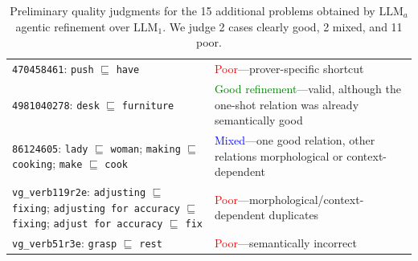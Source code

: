\begin{table}[t]
\begin{tabularx}{\textwidth}{@{}p{}p{}@{}}
\texttt{470458461}: \texttt{push} $\sqsubseteq$ \texttt{have} & \textcolor{red}{Poor}---prover-specific shortcut \\
\texttt{4981040278}: \texttt{desk} $\sqsubseteq$ \texttt{furniture} & \textcolor{green}{Good refinement}---valid, although the one-shot relation was already semantically good \\
\texttt{86124605}: \texttt{lady} $\sqsubseteq$ \texttt{woman}; \texttt{making} $\sqsubseteq$ \texttt{cooking}; \texttt{make} $\sqsubseteq$ \texttt{cook} & \textcolor{blue}{Mixed}---one good relation, other relations morphological or context-dependent \\
\texttt{vg\_verb119r2e}: \texttt{adjusting} $\sqsubseteq$ \texttt{fixing}; \texttt{adjusting for accuracy} $\sqsubseteq$ \texttt{fixing}; \texttt{adjust for accuracy} $\sqsubseteq$ \texttt{fix} & \textcolor{red}{Poor}---morphological/context-dependent duplicates \\
\texttt{vg\_verb51r3e}: \texttt{grasp} $\sqsubseteq$ \texttt{rest} & \textcolor{red}{Poor}---semantically incorrect \\
\bottomrule
\end{tabularx}
\caption{Preliminary quality judgments for the 15 additional problems obtained by $\mathrm{LLM}_{a}$ agentic refinement over $\mathrm{LLM}_{1}$. We judge 2 cases clearly good, 2 mixed, and 11 poor.}
\label{tab:gemini-agentic-quality-plus15}
\end{table}
